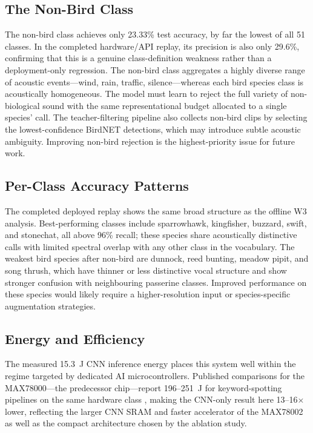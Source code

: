 \documentclass[conference]{IEEEtran}
\begin{document}
\subsection{The Non-Bird Class}
The non-bird class achieves only 23.33\% test accuracy, by far the lowest of all 51 classes. In the completed hardware/API replay, its precision is also only 29.6\%, confirming that this is a genuine class-definition weakness rather than a deployment-only regression. The non-bird class aggregates a highly diverse range of acoustic events---wind, rain, traffic, silence---whereas each bird species class is acoustically homogeneous. The model must learn to reject the full variety of non-biological sound with the same representational budget allocated to a single species' call. The teacher-filtering pipeline also collects non-bird clips by selecting the lowest-confidence BirdNET detections, which may introduce subtle acoustic ambiguity. Improving non-bird rejection is the highest-priority issue for future work.

\subsection{Per-Class Accuracy Patterns}
The completed deployed replay shows the same broad structure as the offline W3 analysis. Best-performing classes include sparrowhawk, kingfisher, buzzard, swift, and stonechat, all above 96\% recall; these species share acoustically distinctive calls with limited spectral overlap with any other class in the vocabulary. The weakest bird species after non-bird are dunnock, reed bunting, meadow pipit, and song thrush, which have thinner or less distinctive vocal structure and show stronger confusion with neighbouring passerine classes. Improved performance on these species would likely require a higher-resolution input or species-specific augmentation strategies.

\subsection{Energy and Efficiency}
The measured 15.3~\textmu J CNN inference energy places this system well within the regime targeted by dedicated AI microcontrollers. Published comparisons for the MAX78000---the predecessor chip---report 196--251~\textmu J for keyword-spotting pipelines on the same hardware class \cite{ulkar2021kws}, making the CNN-only result here 13--16$\times$ lower, reflecting the larger CNN SRAM and faster accelerator of the MAX78002 as well as the compact architecture chosen by the ablation study.
\end{document}
